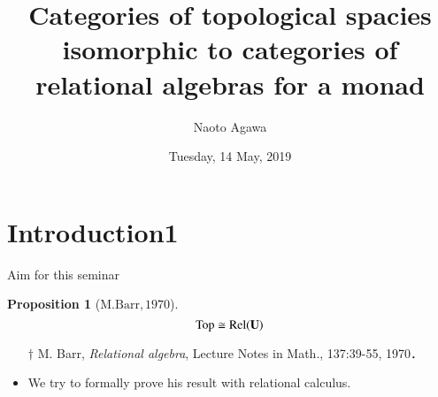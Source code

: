 \documentclass[dvipdfmx,10pt,notheorems]{beamer}
\title{Categories of topological spacies isomorphic to categories of relational algebras for a monad}
\author[Naoto Agawa]
{Naoto Agawa}
\institute[Kyushu Univ., Math Dept.
]{\url{}\\%
}
\date{Tuesday, 14 May, 2019}
\newtheorem{proposition}[theorem]{Proposition}
\renewcommand{\#}{^\sharp}
\begin{document}
\begin{frame}\frametitle{}
  \titlepage
\end{frame}

\begin{frame}\frametitle{}
  \tableofcontents
\end{frame}




\section{Introduction1}
	\begin{frame}{Aim for this seminar}
		\begin{proposition}[$\mathrm{M. Barr},1970$]
				$$ {\rm Top} \cong {\rm Rel(\mathbf{U})} $$
		\end{proposition}
		{\small
			 \begin{itemize}
				\item[$\dagger$]  M. Barr, {\sl Relational algebra}, Lecture Notes in Math., 
				137:39-55, 1970．
			 \end{itemize}
		 }
		\begin{itemize}
			 \item We try to formally prove his result with relational calculus.
		\end{itemize}
	\end{frame}
\end{document}
